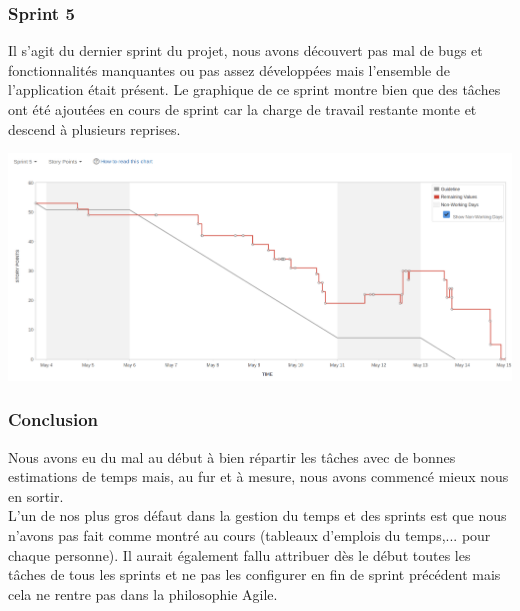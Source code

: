 \documentclass[t, 12pt, usenames,dvipsnames]{article}
\begin{document}
        
            \subsubsection{Sprint 5}
                \noindent Il s'agit du dernier sprint du projet, nous avons découvert pas mal de bugs et fonctionnalités manquantes ou pas assez développées mais l'ensemble de l'application était présent. Le graphique de ce sprint montre bien que des tâches ont été ajoutées en cours de sprint car la charge de travail restante monte et descend à plusieurs reprises. 
                
                \begin{center}
                    \includegraphics[scale=.25]{images/graph-new/sprint5.png}
                    \label{fig:sprint5_graph}
                \end{center}
                
                
           \subsubsection{Conclusion} 
               \noindent Nous avons eu du mal au début à bien répartir les tâches avec de bonnes estimations de temps mais, au fur et à mesure, nous avons commencé mieux nous en sortir. \\
                L'un de nos plus gros défaut dans la gestion du temps et des sprints est que nous n'avons pas fait comme montré au cours (tableaux d'emplois du temps,... pour chaque personne). Il aurait également fallu attribuer dès le début toutes les tâches de tous les sprints et ne pas les configurer en fin de sprint précédent mais cela ne rentre pas dans la philosophie Agile. 
                
        
\end{document}
